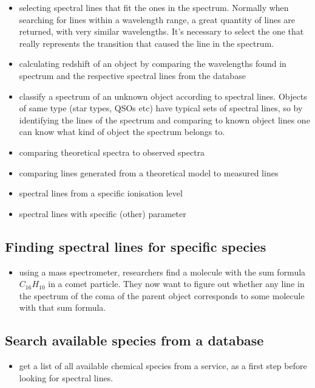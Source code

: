 \documentclass[11pt,a4paper]{ivoa}
\begin{document}
\begin{itemize}
\item selecting  spectral lines that fit the ones in the spectrum.
Normally when searching for lines within a wavelength range, a great quantity of lines are 
returned, with very similar wavelengths. It's necessary to select the one that really 
represents the transition that caused the line in the spectrum.

\item calculating redshift of an object by comparing the wavelengths found in spectrum and the respective 
spectral lines from the database

\item classify a spectrum of an unknown object according to spectral lines. Objects of same type (star types, QSOs etc) have  typical sets of spectral lines, so by identifying the lines of the spectrum and 
comparing to known object lines one can know what kind of object the spectrum belongs to.

\item comparing theoretical spectra to observed spectra
\item comparing  lines generated from a theoretical model to measured lines
\item spectral lines from a specific ionisation level
\item spectral lines with specific (other) parameter
\end{itemize}

\subsection{Finding spectral lines for specific species}
\begin{itemize}
\item using a mass spectrometer, researchers find a molecule with the sum formula $C_{16}H_{10}$  in a 
comet particle.  They now want to figure out whether any line in the spectrum of the coma of the parent object corresponds to some molecule with that sum formula.
\end{itemize}

\subsection{Search available species from a database}

\begin{itemize}
\item get a list of all available chemical species from a service, as a first step before looking 
for spectral lines.
\end{itemize}
\end{document}
